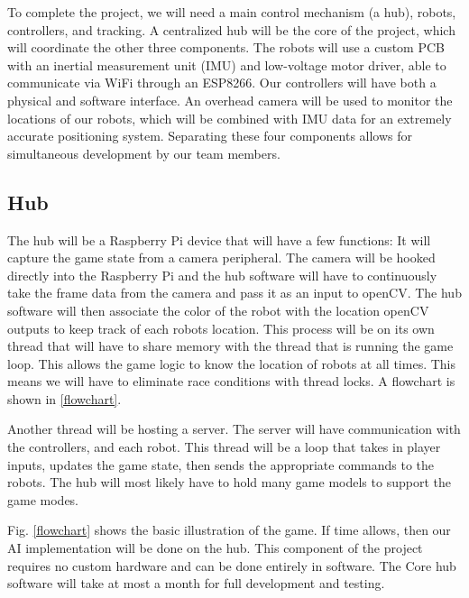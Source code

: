 \documentclass[11pt]{ieeeconf}
\begin{document}
To complete the project, we will need a main control mechanism (a hub), robots, controllers, and tracking. A centralized hub will be the core of the project, which will coordinate the other three components. The robots will use a custom PCB with an inertial measurement unit (IMU) and low-voltage motor driver, able to communicate via WiFi through an ESP8266. Our controllers will have both a physical and software interface. An overhead camera will be used to monitor the locations of our robots, which will be combined with IMU data for an extremely accurate positioning system. Separating these four components allows for simultaneous development by our team members.

\subsection{Hub}
The hub will be a Raspberry Pi device that will have a few functions:
It will capture the game state from a camera peripheral. The camera will be hooked directly into the Raspberry Pi and the hub software will have to continuously take the frame data from the camera and pass it as an input to openCV. The hub software will then associate the color of the robot with the location openCV outputs to keep track of each robots location. This process will be on its own thread that will have to share memory with the thread that is running the game loop. This allows the game logic to know the location of robots at all times. This means we will have to eliminate race conditions with thread locks. A flowchart is shown in \ref{flowchart}.

Another thread will be hosting a server. The server will have communication with the controllers, and each robot. This thread will be a loop that takes in player inputs, updates the game state, then sends the appropriate commands to the robots. The hub will most likely have to hold many game models to support the game modes.

Fig. \ref{flowchart} shows the basic illustration of the game. If time allows, then our AI implementation will be done on the hub. This component of the project requires no custom hardware and can be done entirely in software. The Core hub software will take at most a month for full development and testing. 
\end{document}
